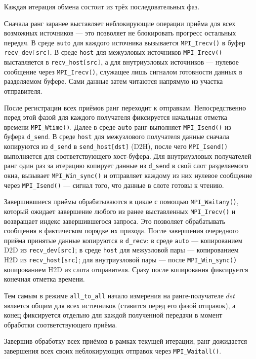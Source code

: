 \documentclass[a4paper,14pt]{extarticle}
\begin{document}
Каждая итерация обмена состоит из трёх последовательных фаз.
 
Сначала ранг заранее выставляет неблокирующие операции приёма для всех возможных источников --- это позволяет не блокировать прогресс остальных передач. В среде \texttt{auto} для каждого источника вызывается \texttt{MPI\_Irecv()} в буфер \texttt{recv\_dev[src]}. В среде \texttt{host} для межузловых источников \texttt{MPI\_Irecv()} выставляется в \texttt{recv\_host[src]}, а для внутриузловых источников --- нулевое сообщение через \texttt{MPI\_Irecv()}, служащее лишь сигналом готовности данных в разделяемом буфере. Сами данные затем читаются напрямую из участка отправителя.
 
После регистрации всех приёмов ранг переходит к отправкам. Непосредственно перед этой фазой для каждого получателя фиксируется начальная отметка времени \texttt{MPI\_Wtime()}. Далее в среде \texttt{auto} ранг выполняет \texttt{MPI\_Isend()} из буфера \texttt{d\_send}. В среде \texttt{host} для межузлового получателя данные сначала копируются из \texttt{d\_send} в \texttt{send\_host[dst]} (D2H), после чего \texttt{MPI\_Isend()} выполняется для соответствующего хост-буфера. Для внутриузловых получателей ранг один раз за итерацию копирует данные из \texttt{d\_send} в свой слот разделяемого окна, вызывает \texttt{MPI\_Win\_sync()} и отправляет каждому из них нулевое сообщение через \texttt{MPI\_Isend()} --- сигнал того, что данные в слоте готовы к чтению.
 
Завершившиеся приёмы обрабатываются в цикле с помощью \texttt{MPI\_Waitany()}, который ожидает завершение любого из ранее выставленных \texttt{MPI\_Irecv()} и возвращает индекс завершившегося запроса. Это позволяет обрабатывать сообщения в фактическом порядке их прихода. После завершения очередного приёма принятые данные копируются в \texttt{d\_recv}: в среде \texttt{auto} --- копированием D2D из \texttt{recv\_dev[src]}; в среде \texttt{host} для межузловой пары --- копированием H2D из \texttt{recv\_host[src]}; для внутриузловой пары --- после \texttt{MPI\_Win\_sync()} копированием H2D из слота отправителя. Сразу после копирования фиксируется конечная отметка времени.
 
Тем самым в режиме \texttt{all\_to\_all} начало измерения на ранге-получателе \(dst\) является общим для всех источников (ставится перед его фазой отправок), а конец фиксируется отдельно для каждой полученной передачи в момент обработки соответствующего приёма.
 
Завершив обработку всех приёмов в рамках текущей итерации, ранг дожидается завершения всех своих неблокирующих отправок через \texttt{MPI\_Waitall()}.
 
\end{document}
